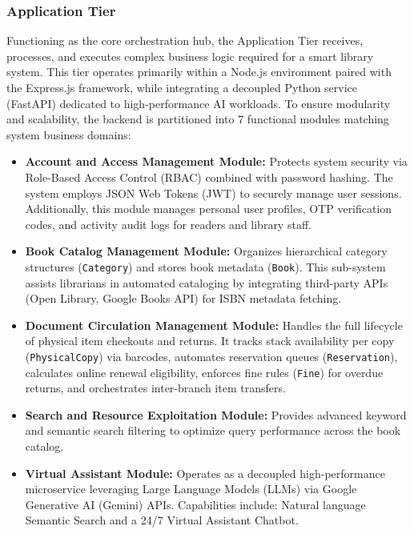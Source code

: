 \subsubsection{Application Tier}
Functioning as the core orchestration hub, the Application Tier receives, processes, and executes complex business logic required for a smart library system. This tier operates primarily within a Node.js environment paired with the Express.js framework, while integrating a decoupled Python service (FastAPI) dedicated to high-performance AI workloads. To ensure modularity and scalability, the backend is partitioned into 7 functional modules matching system business domains:

\begin{itemize}
	\item \textbf{Account and Access Management Module:} Protects system security via Role-Based Access Control (RBAC) combined with password hashing. The system employs JSON Web Tokens (JWT) to securely manage user sessions. Additionally, this module manages personal user profiles, OTP verification codes, and activity audit logs for readers and library staff.

	\item \textbf{Book Catalog Management Module:} Organizes hierarchical category structures (\texttt{Category}) and stores book metadata (\texttt{Book}). This sub-system assists librarians in automated cataloging by integrating third-party APIs (Open Library, Google Books API) for ISBN metadata fetching.

	\item \textbf{Document Circulation Management Module:} Handles the full lifecycle of physical item checkouts and returns. It tracks stack availability per copy (\texttt{PhysicalCopy}) via barcodes, automates reservation queues (\texttt{Reservation}), calculates online renewal eligibility, enforces fine rules (\texttt{Fine}) for overdue returns, and orchestrates inter-branch item transfers.

	\item \textbf{Search and Resource Exploitation Module:} Provides advanced keyword and semantic search filtering to optimize query performance across the book catalog.

	\item \textbf{Virtual Assistant Module:} Operates as a decoupled high-performance microservice leveraging Large Language Models (LLMs) via Google Generative AI (Gemini) APIs. Capabilities include: Natural language Semantic Search and a 24/7 Virtual Assistant Chatbot.


\end{itemize}
